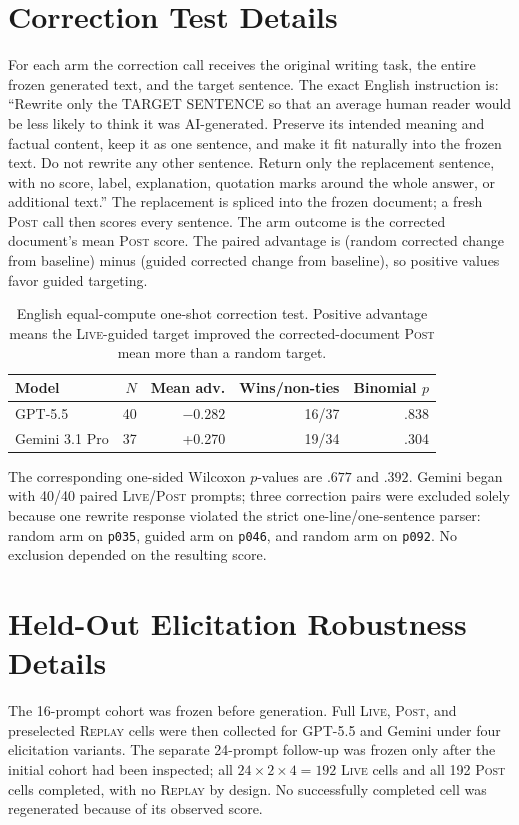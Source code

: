 \documentclass[10pt]{article}
\newcommand{\live}{\textsc{Live}}
\newcommand{\replay}{\textsc{Replay}}
\newcommand{\post}{\textsc{Post}}
\newcommand{\papersection}[1]{\Needspace{4.4\baselineskip}\section{#1}}
\begin{document}
\papersection{Correction Test Details}
\label{app:correction}
For each arm the correction call receives the original writing task, the entire frozen generated text, and the target sentence. The exact English instruction is: ``Rewrite only the TARGET SENTENCE so that an average human reader would be less likely to think it was AI-generated. Preserve its intended meaning and factual content, keep it as one sentence, and make it fit naturally into the frozen text. Do not rewrite any other sentence. Return only the replacement sentence, with no score, label, explanation, quotation marks around the whole answer, or additional text.'' The replacement is spliced into the frozen document; a fresh \post{} call then scores every sentence. The arm outcome is the corrected document's mean \post{} score. The paired advantage is (random corrected change from baseline) minus (guided corrected change from baseline), so positive values favor guided targeting.

\begin{table}[H]
\centering
\small
\setlength{\tabcolsep}{4.5pt}
\caption{English equal-compute one-shot correction test. Positive advantage means the \live{}-guided target improved the corrected-document \post{} mean more than a random target.}
\label{tab:correction}
\begin{tabular}{lrrrr}
\toprule
Model & $N$ & Mean adv. & Wins/non-ties & Binomial $p$ \\
\midrule
GPT-5.5 & 40 & $-0.282$ & 16/37 & .838 \\
Gemini 3.1 Pro & 37 & +0.270 & 19/34 & .304 \\
\bottomrule
\end{tabular}
\end{table}
The corresponding one-sided Wilcoxon $p$-values are $.677$ and $.392$. Gemini began with 40/40 paired \live{}/\post{} prompts; three correction pairs were excluded solely because one rewrite response violated the strict one-line/one-sentence parser: random arm on \texttt{p035}, guided arm on \texttt{p046}, and random arm on \texttt{p092}. No exclusion depended on the resulting score.

\papersection{Held-Out Elicitation Robustness Details}
\label{app:elicitation}
The 16-prompt cohort was frozen before generation. Full \live{}, \post{}, and preselected \replay{} cells were then collected for GPT-5.5 and Gemini under four elicitation variants. The separate 24-prompt follow-up was frozen only after the initial cohort had been inspected; all $24\times2\times4=192$ \live{} cells and all 192 \post{} cells completed, with no \replay{} by design. No successfully completed cell was regenerated because of its observed score.
\end{document}
